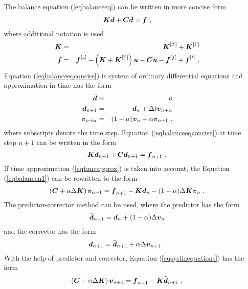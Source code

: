 The balance equation (\ref{eqbalanceeq}) can be written in more concise form
\begin{eqnarray}\label{eqbalanceeqconcise}
\mbox{\boldmath$K$} \mbox{\boldmath$d$} + \mbox{\boldmath$C$} \dot{\mbox{\boldmath$d$}} = \mbox{\boldmath$f$}\ ,
\end{eqnarray}
where additional notation is used
\begin{eqnarray}
\mbox{\boldmath$K$} &=& \mbox{\boldmath$K$}^{[T]}+\mbox{\boldmath$K$}^{[\Gamma]}
\\
\mbox{\boldmath$f$} &=& \mbox{\boldmath$f$}^{[z]} - \left(\mbox{\boldmath$K$}+\mbox{\boldmath$K$}^{[\Gamma]}\right) \mbox{\boldmath$u$} -
\mbox{\boldmath$C$} \dot{\mbox{\boldmath$u$}} - \mbox{\boldmath$f$}^{[f]} + \mbox{\boldmath$f$}^{[t]}\ .
\end{eqnarray}
Equation (\ref{eqbalanceeqconcise}) is system of ordinary differential equations
and approximation in time has the form
\begin{eqnarray}\label{eqtimeapprox}
\dot{\mbox{\boldmath$d$}} &=& \mbox{\boldmath$v$}
\\
\mbox{\boldmath$d$}_{n+1} &=& \mbox{\boldmath$d$}_n + \Delta t \mbox{\boldmath$v$}_{n+\alpha}
\\
\mbox{\boldmath$v$}_{n+\alpha} &=& (1-\alpha) \mbox{\boldmath$v$}_n + \alpha \mbox{\boldmath$v$}_{n+1}\ ,
\end{eqnarray}
where subscripts denote the time step. Equation (\ref{eqbalanceeqconcise}) at time step $n+1$ can be written in the form
\begin{eqnarray}\label{eqbalancen1}
\mbox{\boldmath$K$} \mbox{\boldmath$d$}_{n+1} + \mbox{\boldmath$C$} \mbox{\boldmath$d$}_{n+1} = \mbox{\boldmath$f$}_{n+1}\ .
\end{eqnarray}
If time approximation (\ref{eqtimeapprox}) is taken into account, the Equation (\ref{eqbalancen1}) can be rewritten to the form
\begin{eqnarray}\label{eqsyslinequations}
\left(\mbox{\boldmath$C$} + \alpha \Delta \mbox{\boldmath$K$}\right) \mbox{\boldmath$v$}_{n+1} = \mbox{\boldmath$f$}_{n+1} - \mbox{\boldmath$K$} \mbox{\boldmath$d$}_n - (1-\alpha)\Delta\mbox{\boldmath$K$} \mbox{\boldmath$v$}_n\ .
\end{eqnarray}
The predictor-corrector method can be used, where the predictor has the form
\begin{eqnarray}\label{eqpredictor}
\tilde{\mbox{\boldmath$d$}}_{n+1} = \mbox{\boldmath$d$}_n + (1-\alpha)\Delta \mbox{\boldmath$v$}_n
\end{eqnarray}
and the corrector has the form
\begin{eqnarray}\label{eqcorrector}
\mbox{\boldmath$d$}_{n+1} = \tilde{\mbox{\boldmath$d$}}_{n+1} + \alpha\Delta \mbox{\boldmath$v$}_{n+1}\ .
\end{eqnarray}
With the help of predictor and corrector, Equation (\ref{eqsyslinequations}) has the form
\begin{eqnarray}\label{eqsyslinequations2}
\left(\mbox{\boldmath$C$} + \alpha \Delta \mbox{\boldmath$K$}\right) \mbox{\boldmath$v$}_{n+1} = \mbox{\boldmath$f$}_{n+1} - \mbox{\boldmath$K$} \tilde{\mbox{\boldmath$d$}}_{n+1}\ .
\end{eqnarray}

